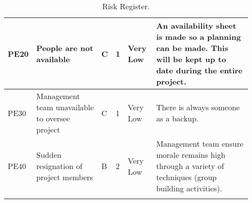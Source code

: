\begin{longtable}{|m{}| m{} |m{} |m{}|m{}| m{}|}
PE20 & People are not available												& C & 1 & \cellcolor[HTML]{34FF34}Very Low	& An availability sheet is made so a planning can be made. This will be kept up to date during the entire project.\\\hline

PE30 & Management team unavailable to oversee project						& C & 1 & \cellcolor[HTML]{34FF34}Very Low	& There is always someone as a backup.\\\hline

PE40 & Sudden resignation of project members								& B & 2 & \cellcolor[HTML]{34FF34}Very Low	& Management team ensure morale remains high through a variety of techniques (group building activities).\\\hline




\caption{Risk Register.}
\label{tab:risk-register}
\end{longtable}
\raggedbottom
